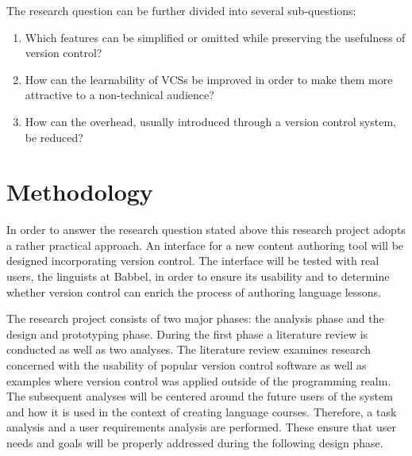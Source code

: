 \noindent %
The research question can be further divided into several sub-questions:

\begin{enumerate}
  \item Which features can be simplified or omitted while  preserving the usefulness of version control?
  \item How can the learnability of VCSs be improved in order to make them more attractive to a non-technical audience?
  \item How can the overhead, usually introduced through a version control system, be reduced?
\end{enumerate}

\section{Methodology}
In order to answer the research question stated above this research project adopts a rather practical approach. An interface for a new content authoring tool will be designed incorporating version control. The interface will be tested with real users, the linguists at Babbel, in order to ensure its usability and to determine whether version control can enrich the process of authoring language lessons.

The research project consists of two major phases: the analysis phase and the design and prototyping phase. During the first phase a literature review is conducted as well as two analyses. The literature review examines research concerned with the usability of popular version control software as well as examples where version control was applied outside of the programming realm. The subsequent analyses will be centered around the future users of the system and how it is used in the context of creating language courses. Therefore, a task analysis and a user requirements analysis are performed. These ensure that user needs and goals will be properly addressed during the following design phase.

